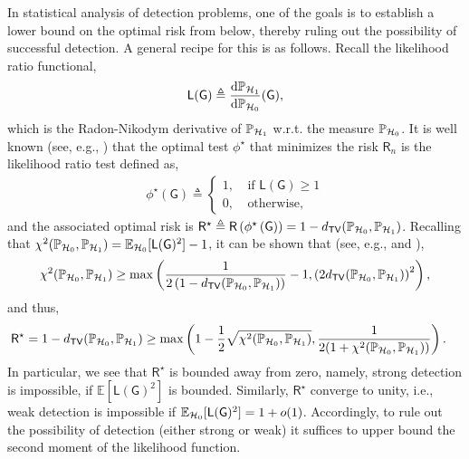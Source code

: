 \documentclass[12pt]{article}
\newcommand{\E}{\mathbb{E}}
\def\P{{\mathbb P}}
\newcommand{\calH}{{\cal H}}
\newcommand{\p}[1]{\left(#1\right)}
\newcommand{\s}[1]{\mathsf{#1}}
\begin{document}
In statistical analysis of detection problems, one of the goals is to establish a lower bound on the optimal risk from below, thereby ruling out the possibility of successful detection. A general recipe for this is as follows. Recall the likelihood ratio functional,
\begin{equation}
    \s{L}(\s{G})\triangleq\frac{\mathrm{d}\P_{\calH_1}}{\mathrm{d}\P_{\calH_0}}(\s{G}),\label{eqn:LIKlihood}
\end{equation} 
which is the Radon-Nikodym derivative of $\P_{\calH_1}$ w.r.t. the measure $\P_{\calH_0}$. It is well known (see, e.g., \cite[Theorem 2.2]{tsybakov2004introduction}) that the optimal test $\phi^{\star}$ that minimizes the risk $\s{R}_n$ is the likelihood ratio test defined as,
\begin{align}
\phi^{\star}\left(\s{G}\right) \triangleq \begin{cases}
1,\ &\text{if }\mathsf{L}\left(\s{G}\right) \geq 1\\
0,\ &\text{otherwise},   
\end{cases}
\end{align}
and the associated optimal risk is $ \mathsf{R}^{\star} \triangleq \mathsf{R}\left(\phi^{\star}\left(\s{G}\right)\right)=1-d_{\s{TV}}(\P_{\calH_0},\P_{\calH_1})$. Recalling that $\chi^2(\P_{\calH_0},\P_{\calH_1})=\E_{\calH_0}[\s{L}(\s{G})^2]-1$, it can be shown that (see, e.g., \cite[Sec. 2]{tsybakov2004introduction} and \cite[Prop. 3]{sason2014bounds}),
\begin{align}
    \chi^2(\P_{\calH_0},\P_{\calH_1})\geq \max\p{\frac{1}{2\p{1-d_{\s{TV}}(\P_{\calH_0},\P_{\calH_1})}}-1,\p{2d_{\s{TV}}(\P_{\calH_0},\P_{\calH_1})}^2},
\end{align}
and thus,
\begin{align}
    \mathsf{R}^{\star}&=1-d_{\s{TV}}(\P_{\calH_0},\P_{\calH_1})\geq \max\p{1-\frac{1}{2}\sqrt{\chi^2(\P_{\calH_0},\P_{\calH_1})},\frac{1}{2(1+\chi^2(\P_{\calH_0},\P_{\calH_1}))}}.\label{eqn:lowerBoundSecond}
\end{align}
In particular, we see that $\s{R}^\star$ is bounded away from zero, namely, strong detection is impossible, if $\E[\s{L}(\s{G})^2]$ is bounded. Similarly, $\s{R}^\star$ converge to unity, i.e., weak detection is impossible if $\E_{\calH_0}[\s{L}(\s{G})^2]=1+o(1)$. Accordingly, to rule out the possibility of detection (either strong or weak) it suffices to upper bound the second moment of the likelihood function. 
\end{document}
